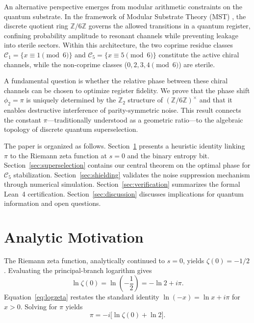 \documentclass[aps,pra,twocolumn,10pt,superscriptaddress]{revtex4-2}
\newcommand{\Zmod}{\mathbb{Z}/6\mathbb{Z}}
\begin{document}
An alternative perspective emerges from modular arithmetic constraints on the quantum substrate. In the framework of Modular Substrate Theory (MST) \cite{PeinadorTopologico}, the discrete quotient ring $\Zmod$ governs the allowed transitions in a quantum register, confining probability amplitude to resonant channels while preventing leakage into sterile sectors. Within this architecture, the two coprime residue classes $\mathcal{C}_1 = \{x \equiv 1 \pmod 6\}$ and $\mathcal{C}_5 = \{x \equiv 5 \pmod 6\}$ constitute the active chiral channels, while the non-coprime classes ($0, 2, 3, 4 \pmod 6$) are sterile.

A fundamental question is whether the relative phase between these chiral channels can be chosen to optimize register fidelity. We prove that the phase shift $\phi_2 = \pi$ is uniquely determined by the $\mathbb{Z}_2$ structure of $(\Zmod)^\times$ and that it enables destructive interference of parity-symmetric noise. This result connects the constant $\pi$---traditionally understood as a geometric ratio---to the algebraic topology of discrete quantum superselection.

The paper is organized as follows. Section~\ref{sec:motivation} presents a heuristic identity linking $\pi$ to the Riemann zeta function at $s=0$ and the binary entropy bit. Section~\ref{sec:superselection} contains our central theorem on the optimal phase for $\mathcal{C}_5$ stabilization. Section~\ref{sec:shielding} validates the noise suppression mechanism through numerical simulation. Section~\ref{sec:verification} summarizes the formal Lean~4 certification. Section~\ref{sec:discussion} discusses implications for quantum information and open questions.

\section{Analytic Motivation}
\label{sec:motivation}

The Riemann zeta function, analytically continued to $s=0$, yields $\zeta(0) = -1/2$ \cite{Edwards1974}. Evaluating the principal-branch logarithm gives
\begin{equation}
\ln\zeta(0) = \ln\left(-\frac{1}{2}\right) = -\ln 2 + i\pi.
\label{eq:logzeta}
\end{equation}
Equation~\eqref{eq:logzeta} restates the standard identity $\ln(-x) = \ln x + i\pi$ for $x > 0$. Solving for $\pi$ yields
\begin{equation}
\pi = -i\bigl[\ln\zeta(0) + \ln 2\bigr].
\label{eq:master}
\end{equation}
\end{document}
